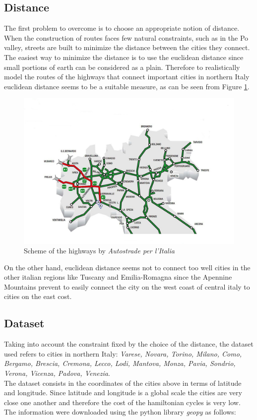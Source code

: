 \documentclass{article}
\begin{document}
\subsection{Distance}
The first problem to overcome is to choose an appropriate notion of distance. When the construction of routes faces few natural constraints, such as in the Po valley, streets are built to minimize the distance between the cities they connect. The easiest way to minimize the distance is to use the euclidean distance since small portions of earth can be considered as a plain. Therefore to realistically model the routes of the highways that connect important cities in northern Italy euclidean distance seems to be a suitable measure, as can be seen from Figure \ref{autostrade}.
\begin{figure}[H] 
\includegraphics[scale=0.4]{autostrade.jpg} 
\centering
\caption{Scheme of the highways by \textit{Autostrade per l'Italia}\cite{autostrade}} \label{autostrade}
\end{figure}
\noindent On the other hand, euclidean distance seems not to connect too well cities in the other italian regions like Tuscany and Emilia-Romagna since the Apennine Mountains prevent to easily connect the city on the west coast of central italy to cities on the east cost.


\subsection{Dataset}
Taking into account the constraint fixed by the choice of the distance, the dataset used refers to cities in northern Italy: \textit{Varese, Novara, Torino, Milano, Como, Bergamo, Brescia, Cremona, Lecco, Lodi, Mantova, Monza, Pavia, Sondrio, Verona, Vicenza, Padova, Venezia}. \\
The dataset consists in the coordinates of the cities above in terms of latitude and longitude. Since latitude and longitude is a global scale the cities are very close one another and therefore the cost of the hamiltonian cycles is very low.\\
The information were downloaded using the python library \textit{geopy} as follows:
\end{document}
